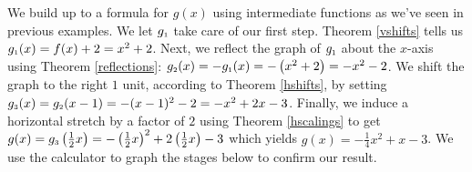 {
We build up to a formula for $g(x)$ using intermediate functions as we've seen in previous examples.  We let $g_{\mbox{\tiny$1$}}$ take care of our first step.  Theorem \ref{vshifts} tells us $g_{\mbox{\tiny$1$}}(x) = f(x) + 2 = x^2+2$.  Next, we reflect the graph of $g_{\mbox{\tiny$1$}}$ about the $x$-axis using Theorem \ref{reflections}:  $g_{\mbox{\tiny$2$}}(x) = -g_{\mbox{\tiny$1$}}(x) = -\left(x^2+2\right) = -x^2-2$.  We shift the graph to the right $1$ unit, according to Theorem \ref{hshifts}, by setting $g_{\mbox{\tiny$3$}}(x) = g_{\mbox{\tiny$2$}}(x-1) = -(x-1)^2-2 = -x^2+2x-3$.  Finally, we induce a horizontal stretch by a factor of $2$ using Theorem \ref{hscalings} to get $g(x) = g_{\mbox{\tiny$3$}}\left(\frac{1}{2} x\right) = -\left(\frac{1}{2} x\right)^2+2\left(\frac{1}{2} x\right)-3$ which yields $g(x) = -\frac{1}{4} x^2 + x -3$.  We use the calculator to graph the stages below to confirm our result.

}

